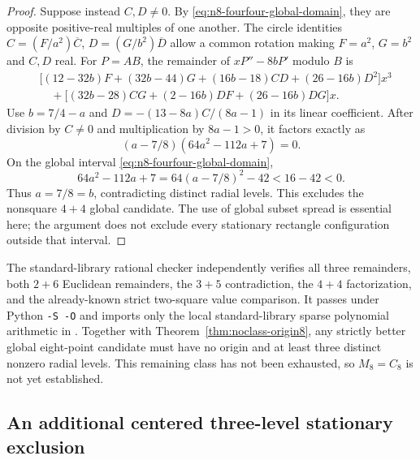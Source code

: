\documentclass[11pt]{article}
\theoremstyle{remark}
\numberwithin{equation}{section}
\begin{document}
\begin{proof}
Suppose instead $C,D\ne0$. By
\eqref{eq:n8-fourfour-global-domain}, they are opposite positive-real
multiples of one another. The circle identities
$C=(F/a^2)\overline C$, $D=(G/b^2)\overline D$ allow a common rotation
making $F=a^2$, $G=b^2$ and $C,D$ real. For $P=AB$, the remainder
of $xP''-8bP'$ modulo $B$ is
\begin{align*}
 &\bigl[(12-32b)F+(32b-44)G+(16b-18)CD+(26-16b)D^2\bigr]x^3\\
 &\quad+\bigl[(32b-28)CG+(2-16b)DF+(26-16b)DG\bigr]x.
\end{align*}
Use $b=7/4-a$ and $D=-(13-8a)C/(8a-1)$ in its linear coefficient.
After division by $C\ne0$ and multiplication by $8a-1>0$, it factors
exactly as
\[
                  (a-7/8)(64a^2-112a+7)=0.
\]
On the global interval \eqref{eq:n8-fourfour-global-domain},
\[
 64a^2-112a+7=64(a-7/8)^2-42<16-42<0.
\]
Thus $a=7/8=b$, contradicting distinct radial levels. This excludes
the nonsquare $4+4$ global candidate. The use of global subset spread
is essential here; the argument does not exclude every stationary
rectangle configuration outside that interval.
\end{proof}

The standard-library rational checker
 independently verifies
all three remainders, both $2+6$ Euclidean remainders, the $3+5$
contradiction, the $4+4$ factorization, and the already-known
strict two-square value comparison. It passes under Python
\texttt{-S -O} and imports only the local standard-library sparse
polynomial arithmetic in .
Together with Theorem~\ref{thm:noclass-origin8}, any strictly better
global eight-point candidate must have no origin and at least three
distinct nonzero radial levels. This remaining class has not been
exhausted, so $M_8=C_8$ is not yet established.

\subsection{An additional centered three-level stationary exclusion}
\end{document}
